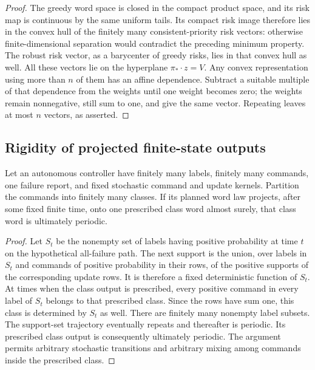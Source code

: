 \begin{proof}
The greedy word space is closed in the compact product space, and
its risk map is continuous by the same uniform tails.  Its compact
risk image therefore lies in the convex hull of the finitely many
consistent-priority risk vectors: otherwise finite-dimensional
separation would contradict the preceding minimum property.
The robust risk vector, as a barycenter of greedy risks, lies in
that convex hull as well.  All these vectors lie on the hyperplane
$\pi_*\cdot z=V$.  Any convex representation using more than $n$
of them has an affine dependence.  Subtract a suitable multiple
of that dependence from the weights until one weight becomes zero;
the weights remain nonnegative, still sum to one, and give the same
vector.  Repeating leaves at most $n$ vectors, as asserted.
\end{proof}

\subsection{Rigidity of projected finite-state outputs}

\begin{lemma}
\label{lem:r80-projected-word-rigidity}
Let an autonomous controller have finitely many labels, finitely many
commands, one failure report, and fixed stochastic command and update
kernels.  Partition the commands into finitely many classes.  If its
planned word law projects, after some fixed finite time, onto one
prescribed class word almost surely, that class word is ultimately
periodic.
\end{lemma}
\begin{proof}
Let $S_t$ be the nonempty set of labels having positive probability
at time $t$ on the hypothetical all-failure path.  The next support is
the union, over labels in $S_t$ and commands of positive probability
in their rows, of the positive supports of the corresponding update
rows.  It is therefore a fixed deterministic function of $S_t$.
At times when the class output is prescribed, every positive command
in every label of $S_t$ belongs to that prescribed class.  Since the
rows have sum one, this class is determined by $S_t$ as well.
There are finitely many nonempty label subsets.  The support-set
trajectory eventually repeats and thereafter is periodic.  Its
prescribed class output is consequently ultimately periodic.  The
argument permits arbitrary stochastic transitions and arbitrary
mixing among commands inside the prescribed class.
\end{proof}

